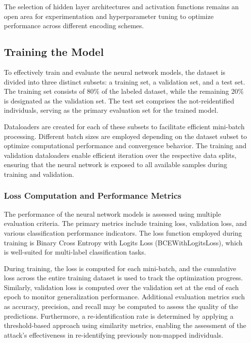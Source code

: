 The selection of hidden layer architectures and activation functions remains an open area for experimentation and hyperparameter tuning to optimize performance across different encoding schemes.

\subsection{Training the Model} \label{sec:training}

To effectively train and evaluate the neural network models, the dataset is divided into three distinct subsets: a training set, a validation set, and a test set. The training set consists of 80\% of the labeled dataset, while the remaining 20\% is designated as the validation set. The test set comprises the not-reidentified individuals, serving as the primary evaluation set for the trained model.

Dataloaders are created for each of these subsets to facilitate efficient mini-batch processing. Different batch sizes are employed depending on the dataset subset to optimize computational performance and convergence behavior. The training and validation dataloaders enable efficient iteration over the respective data splits, ensuring that the neural network is exposed to all available samples during training and validation.

\subsubsection{Loss Computation and Performance Metrics}

The performance of the neural network models is assessed using multiple evaluation criteria. The primary metrics include training loss, validation loss, and various classification performance indicators. The loss function employed during training is Binary Cross Entropy with Logits Loss (BCEWithLogitsLoss), which is well-suited for multi-label classification tasks.

During training, the loss is computed for each mini-batch, and the cumulative loss across the entire training dataset is used to track the optimization progress. Similarly, validation loss is computed over the validation set at the end of each epoch to monitor generalization performance. Additional evaluation metrics such as accuracy, precision, and recall may be computed to assess the quality of the predictions. Furthermore, a re-identification rate is determined by applying a threshold-based approach using similarity metrics, enabling the assessment of the attack’s effectiveness in re-identifying previously non-mapped individuals.

